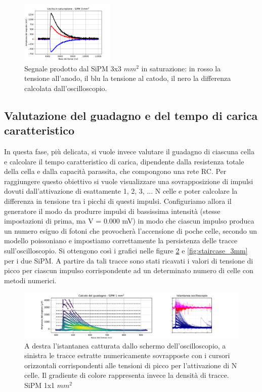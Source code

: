 \documentclass[journal]{IEEEtran}
\begin{document}
\begin{figure}[H]%
\begin{center}
\includegraphics[width=0.40\textwidth]{analysis/output/SiPM_sat_3mm.pdf}
\caption{Segnale prodotto dal SiPM 3x3 $mm^2$ in saturazione: in rosso la tensione all'anodo, il blu la tensione al catodo, il nero la differenza calcolata dall'oscilloscopio.}
\label{fig:SiPM_sat_3mm}
\end{center}
\end{figure}

\subsection{Valutazione del guadagno e del tempo di carica caratteristico}
In questa fase, più delicata, si vuole invece valutare il guadagno di ciascuna cella e calcolare il tempo caratteristico di carica, dipendente dalla resistenza totale della cella e dalla capacità parassita, che compongono una rete RC. Per raggiungere questo obiettivo si vuole visualizzare una sovrapposizione di impulsi dovuti dall'attivazione di esattamente 1, 2, 3, ... N celle e poter calcolare la differenza in tensione tra i picchi di questi impulsi. Configuriamo allora il generatore il modo da produrre impulsi di bassissima intensità (stesse impostazioni di prima, ma V = 0.000 mV) in modo che ciascun impulso produca un numero esiguo di fotoni che provocherà l'accensione di poche celle, secondo un modello poissoniano e impostiamo correttamente la persistenza delle tracce sull'oscilloscopio. Si ottengono così i grafici nelle figure \ref{fig:staircase_1mm} e \ref{fig:staircase_3mm} per i due SiPM. A partire da tali tracce sono stati ricavati i valori di tensione di picco per ciascun impulso corrispondente ad un determinato numero di celle con metodi numerici.

\begin{figure}[t]%
\centering
\begin{center}
\includegraphics[width=1.05\textwidth]{analysis/output/SiPM_1mm_gain_staircase.pdf}
\end{center}
\caption{A destra l'istantanea catturata dallo schermo dell'oscilloscopio, a sinistra le tracce estratte numericamente sovrapposte con i cursori orizzontali corrispondenti alle tensioni di picco per l'attivazione di N celle. Il gradiente di colore rappresenta invece la densità di tracce. SiPM 1x1 $mm^2$}
\label{fig:staircase_1mm}
\end{figure}
\end{document}
